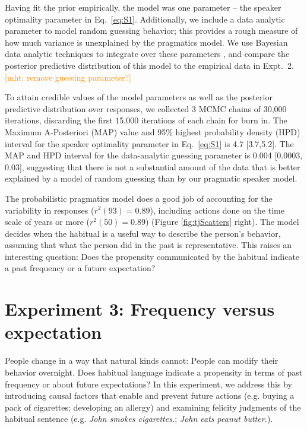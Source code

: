 \documentclass[10pt,letterpaper]{article}
\newcommand{\ndg}[1]{\textcolor{Green}{[ndg: #1]}}
\newcommand{\mht}[1]{\textcolor{DarkOrange}{[mht: #1]}}
\begin{document}
Having fit the prior empirically, the model was one parameter -- the speaker optimality parameter in Eq.~\ref{eq:S1}. 
Additionally, we include a data analytic parameter to model random guessing behavior; this provides a rough measure of how much variance is unexplained by the pragmatics model. 
We use Bayesian data analytic techniques to integrate over these parameters \cite{LW2014}, and compare the posterior predictive distribution of this model to the empirical data in Expt.~2.
\mht{remove guessing parameter?}

To attain credible values of the model parameters as well as the posterior predictive distribution over responses, we collected 3 MCMC chains of 30,000 iterations, discarding the first 15,000 iterations of each chain for burn in.
The Maximum A-Posteriori (MAP) value and 95\% highest probability density (HPD) interval for the speaker optimality parameter in Eq.~\ref{eq:S1} is 4.7 [3.7,5.2].
The MAP and HPD interval for the data-analytic guessing parameter is 0.004 [0.0003, 0.03], suggesting that there is not a substantial amount of the data that is better explained by a model of random guessing than by our pragmatic speaker model.

The probabilistic pragmatics model does a good job of accounting for the variability in responses ($r^2(93) = 0.89$), including actions done on the time scale of years or more  ($r^2(50) = 0.89$) (Figure \ref{fig:tjScatters} right).
The model decides when the habitual is a useful way to describe the person's behavior, assuming that what the person did in the past is representative. 
This raises an interesting question: Does the propensity communicated by the habitual indicate a past frequency or a future expectation?


\section{Experiment 3: Frequency versus expectation}

People change in a way that natural kinds cannot: People can modify their behavior overnight.
Does habitual language indicate a propensity in terms of past frequency or about future expectations?
In this experiment, we address this by introducing causal factors that enable and prevent future actions (e.g. buying a pack of cigarettes; developing an allergy) and examining felicity judgments of the habitual sentence (e.g. \emph{John smokes cigarettes.}; \emph{John eats peanut butter.}).
\end{document}
